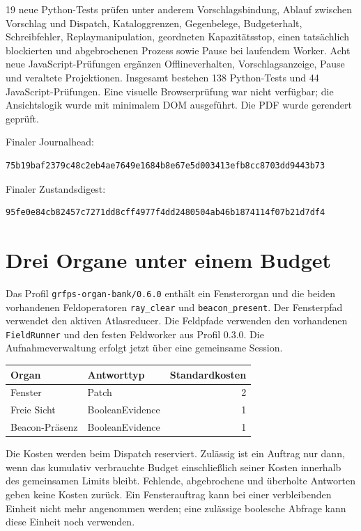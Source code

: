 \documentclass[11pt,a4paper]{article}
\newcommand{\nextsection}[2]{\clearpage{\color{accent}\small\textsf{#1}}\section{#2}}
\begin{document}
19 neue Python-Tests prüfen unter anderem Vorschlagsbindung,
Ablauf zwischen Vorschlag und Dispatch, Kataloggrenzen, Gegenbelege,
Budgeterhalt, Schreibfehler, Replaymanipulation, geordneten Kapazitätsstop,
einen tatsächlich blockierten und abgebrochenen Prozess sowie Pause
bei laufendem Worker. Acht neue JavaScript-Prüfungen ergänzen
Offlineverhalten, Vorschlagsanzeige, Pause und veraltete Projektionen.
Insgesamt bestehen 138 Python-Tests und 44 JavaScript-Prüfungen.
Eine visuelle Browserprüfung war nicht verfügbar; die Ansichtslogik
wurde mit minimalem DOM ausgeführt. Die PDF wurde gerendert geprüft.

Finaler Journalhead:
\begin{lstlisting}
75b19baf2379c48c2eb4ae7649e1684b8e67e5d003413efb8cc8703dd9443b73
\end{lstlisting}
Finaler Zustandsdigest:
\begin{lstlisting}
95fe0e84cb82457c7271dd8cff4977f4dd2480504ab46b1874114f07b21d7df4
\end{lstlisting}

\nextsection{38 / GEMISCHTE ORGANBANK}{Drei Organe unter einem Budget}
Das Profil \texttt{grfps-organ-bank/0.6.0} enthält ein Fensterorgan
und die beiden vorhandenen Feldoperatoren \texttt{ray\_clear} und
\texttt{beacon\_present}. Der Fensterpfad verwendet den aktiven
Atlasreducer. Die Feldpfade verwenden den vorhandenen
\texttt{FieldRunner} und den festen Feldworker aus Profil 0.3.0.
Die Aufnahmeverwaltung erfolgt jetzt über eine gemeinsame Session.

\begin{center}\begin{tabular}{@{}llr@{}}\toprule
Organ & Antworttyp & Standardkosten\\\midrule
Fenster & Patch & 2\\
Freie Sicht & BooleanEvidence & 1\\
Beacon-Präsenz & BooleanEvidence & 1\\\bottomrule
\end{tabular}\end{center}

Die Kosten werden beim Dispatch reserviert. Zulässig ist ein Auftrag
nur dann, wenn das kumulativ verbrauchte Budget einschließlich seiner
Kosten innerhalb des gemeinsamen Limits bleibt. Fehlende, abgebrochene
und überholte Antworten geben keine Kosten zurück. Ein Fensterauftrag
kann bei einer verbleibenden Einheit nicht mehr angenommen werden;
eine zulässige boolesche Abfrage kann diese Einheit noch verwenden.
\end{document}
